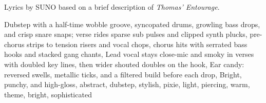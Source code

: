 
\begin{notes}
Lyrics by SUNO based on a brief description of \emph{Thomas’ Entourage}.
\end{notes}
\begin{style}
Dubstep with a half-time wobble groove, syncopated drums, growling bass drops, and crisp snare snaps; verse rides sparse sub pulses and clipped synth plucks, pre-chorus strips to tension risers and vocal chops, chorus hits with serrated bass hooks and stacked gang chants, Lead vocal stays close-mic and smoky in verses with doubled key lines, then wider shouted doubles on the hook, Ear candy: reversed swells, metallic ticks, and a filtered build before each drop, Bright, punchy, and high-gloss, abstract, dubstep, stylish, pixie, light, piercing, warm, theme, bright, sophisticated
\end{style}
